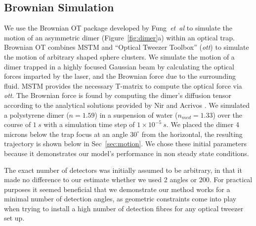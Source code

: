 \subsection{Brownian Simulation}
\label{sec:brownian}

We use the Brownian OT package developed by Fung~\textit{et~al} \cite{Vigilante2020} to simulate the motion of an asymmetric dimer (Figure~\ref{fig:dimer}a) within an optical trap. Brownian OT combines MSTM \cite{Mackowski1996} and ``Optical Tweezer Toolbox'' (\textit{ott}) \cite{Lenton2020} to simulate the motion of arbitrary
shaped sphere clusters. We simulate the motion of a dimer trapped in a highly focused Gaussian beam by calculating the optical forces imparted by the laser, and the Brownian force due to the surrounding fluid. MSTM provides the necessary T-matrix to compute the optical force via \textit{ott}. The Brownian force is found by computing the dimer's diffusion tensor according to the analytical solutions provided by Nir and Acrivos \cite{nir_acrivos_1973}. We simulated a polystyrene dimer ($n = 1.59$) in a suspension of water ($n_{med} = 1.33$) over the course of $1 \ s$ with a simulation time step of $1 \times 10^{-5} \ s$. We placed the dimer 4 microns below the trap focus at an angle $30^{\circ}$ from the horizontal, the resulting trajectory is shown below in Sec~\ref{sec:motion}. We chose these initial parameters because it demonstrates our model's performance in non steady state conditions. 

The exact number of detectors was initially assumed to be arbitrary, in that it made no difference to our estimate whether we used 2 angles or 200. For practical purposes it seemed beneficial that we demonstrate our method works for a minimal number of detection angles, as geometric constraints come into play when trying to install a high number of detection fibres for any optical tweezer set up. 



